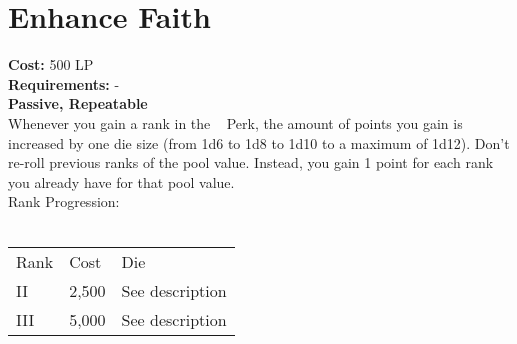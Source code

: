 \section{Enhance Faith}\label{sec:enhanceFaith}
\textbf{Cost:} 500 LP\\
\textbf{Requirements:} -\\
\textbf{Passive, Repeatable}\\
Whenever you gain a rank in the ~ Perk, the amount of points you gain is increased by one die size (from 1d6 to 1d8 to 1d10 to a maximum of 1d12).
Don't re-roll previous ranks of the pool value.
Instead, you gain 1 point for each rank you already have for that pool value.
\\
Rank Progression:\\
\\
\begin{tabular}{l | l | p{12cm} }
    Rank & Cost & Die\\
    II & 2,500 & See description \\
    III & 5,000 & See description \\
\end{tabular}
